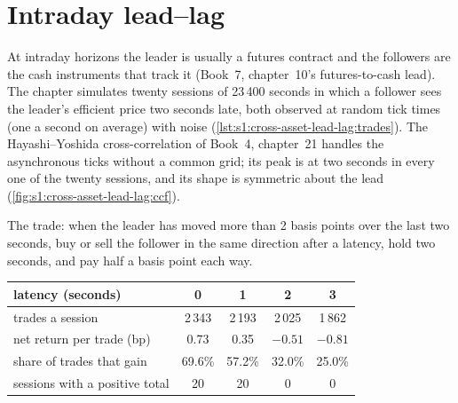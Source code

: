 \section{Intraday lead--lag}

At intraday horizons the leader is usually a futures contract and the followers are the cash instruments that track it (Book~7, chapter~10's
futures-to-cash lead). The chapter simulates twenty sessions of 23\,400 seconds in which a follower sees the leader's efficient price two seconds late,
both observed at random tick times (one a second on average) with noise (\cref{lst:s1:cross-asset-lead-lag:trades}). The Hayashi--Yoshida
cross-correlation of Book~4, chapter~21 handles the asynchronous ticks without a common grid; its peak is at two seconds in every one of the twenty
sessions, and its shape is symmetric about the lead (\cref{fig:s1:cross-asset-lead-lag:ccf}).

\begin{omfigure}

\label{fig:s1:cross-asset-lead-lag:ccf}
\end{omfigure}

The trade: when the leader has moved more than 2 basis points over the last two seconds, buy or sell the follower in the same direction after a latency,
hold two seconds, and pay half a basis point each way.

\begin{center}
\small
\begin{tabular}{@{}lcccc@{}}
\toprule
latency (seconds) & 0 & 1 & 2 & 3\\
\midrule
trades a session & 2\,343 & 2\,193 & 2\,025 & 1\,862\\
net return per trade (bp) & 0.73 & 0.35 & $-0.51$ & $-0.81$\\
share of trades that gain & 69.6\% & 57.2\% & 32.0\% & 25.0\%\\
sessions with a positive total & 20 & 20 & 0 & 0\\
\bottomrule
\end{tabular}
\end{center}

